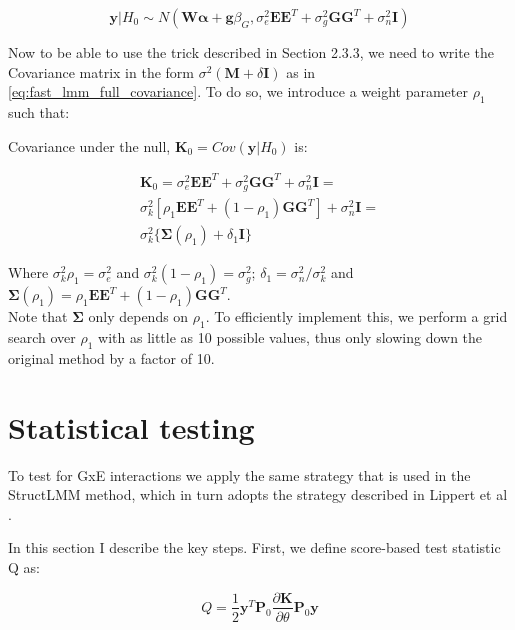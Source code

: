 \begin{equation}\label{eq:scStructLMM_H0_MVN}
 \mathbf{y}|H_0 \sim N( \mathbf{W}\boldsymbol{\alpha} + \mathbf{g}\beta_G, \sigma_e^2 \mathbf{E}\mathbf{E}^T + \sigma_g^2 \mathbf{G}\mathbf{G}^T+ \sigma_n^2 \mathbf{I} )
\end{equation}

Now to be able to use the trick described in Section 2.3.3, we need to write the Covariance matrix in the form $\sigma^2(\mathbf{M}+\delta\mathbf{I})$ as in \eqref{eq:fast_lmm_full_covariance}.
To do so, we introduce a weight parameter $\rho_1$ such that:

Covariance under the null, $\mathbf{K}_0 = Cov(\mathbf{y} | H_0)$ is:

\begin{equation}
\begin{split}
    \mathbf{K}_0 = \sigma_e^2 \mathbf{E}\mathbf{E}^T + \sigma_g^2 \mathbf{G}\mathbf{G}^T+ \sigma_n^2 \mathbf{I} =\\
    \sigma_k^2[\rho_1\mathbf{E}\mathbf{E}^T + (1-\rho_1) \mathbf{G}\mathbf{G}^T] + \sigma_n^2 \mathbf{I} =\\ \sigma_k^2\{\boldsymbol{\Sigma}(\rho_1) + \delta_1 \mathbf{I}\}
\end{split}
\end{equation}

Where $\sigma_k^2\rho_1 = \sigma_e^2$ and $\sigma_k^2(1-\rho_1) = \sigma_g^2$;
$\delta_1 = \sigma_n^2/\sigma_k^2$ and $\boldsymbol{\Sigma}(\rho_1) = \rho_1\mathbf{E}\mathbf{E}^T + (1-\rho_1) \mathbf{G}\mathbf{G}^T$.\\

Note that $\boldsymbol{\Sigma}$ only depends on $\rho_1$. 
To efficiently implement this, we perform a grid search over $\rho_1$ with as little as 10 possible values, thus only slowing down the original method by a factor of 10.

\section{Statistical testing}

To test for GxE interactions we apply the same strategy that is used in the StructLMM method, which in turn adopts the strategy described in Lippert et al \cite{lippert2011fast}.

In this section I describe the key steps.
First, we define score-based test statistic Q as:

\begin{equation}
    Q = \frac{1}{2}\mathbf{y}^T\mathbf{P}_0 \frac{\partial \mathbf{K}}{\partial \theta}\mathbf{P}_0 \mathbf{y} 
\end{equation}

